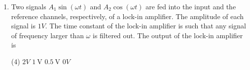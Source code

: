 \begin{enumerate}
\begin{figure}[H]
		\centering
		\texttt{[image: e60]}
	\end{figure}
	The magnitude of the gain at a input signal frequency of $16 \mathrm{kHz}$ is
	{}
	\begin{tasks}(4)
		\task[\textbf{B.}] $0.15$
		\task[\textbf{C.}] $0.3$
		\task[\textbf{D.}] $3.5$
	\end{tasks}
\begin{answer}
	\begin{align*}
	\frac{V_{o}}{V_{i n}}&=-\frac{z_{F}}{z_{i}}=-\frac{R_{F} \| X_{C_{F}}}{R_{i}+X_{C_{i}}}=-\frac{R_{F} \times \frac{1}{J \omega c_{F}} /\left(R_{F}+\frac{1}{J \omega c_{F}}\right)}{\left(R_{i}+\frac{1}{J \omega c_{i}}\right)}\\
	\frac{V_{o}}{V_{i n}}&=\frac{-R_{F} /\left(J \omega c_{F} R_{F}+1\right)}{\left(j \omega c_{i} R_{i}+1\right) / j \omega c_{i}}=\frac{-R_{F}}{\left(j \omega c_{F} R_{F}+1\right)} \times \frac{j \omega c_{i}}{\left(1+j \omega R_{i} c_{i}\right)}\\
	\Rightarrow\left|\frac{V_{o}}{V_{\text {in }}}\right|&=\frac{\omega c_{i} R_{F}}{\sqrt{1+\left(\omega c_{F} R_{F}\right)^{2}} \sqrt{1+\left(\omega R_{i} c_{i}\right)^{2}}}, \omega=2 \pi f
	\intertext{$\Rightarrow\left|\frac{V_{0}}{V_{\text {ln }}}\right|=\frac{\left(2 \pi \times 16 \times 10^{3}\right)\left(10 \times 10^{-9}\right)\left(200 \times 10^{3}\right)}{\sqrt{1+4 \pi^{2}\left(16 \times 10^{3}\right)^{2}\left(200 \times 10^{3}\right)^{2}\left(100 \times 10^{-12}\right)^{2}} \sqrt{1+4 \pi^{2}\left(16 \times 10^{3}\right)^{2}\left(20 \times 10^{3}\right)^{2}\left(10 \times 10^{-9}\right)^{2}}}$}
	\Rightarrow\left|\frac{V_{0}}{V_{\mathrm{ln}}}\right|&=\frac{64 \pi}{2.4 \times 20.12} \approx 4.45
	\end{align*}
	So the correct answer is \textbf{Option (D)}
\end{answer}
	\item Two signals $A_{1} \sin (\omega t)$ and $A_{2} \cos (\omega t)$ are fed into the input and the reference channels, respectively, of a lock-in amplifier. The amplitude of each signal is $1 V$. The time constant of the lock-in amplifier is such that any signal of frequency larger than $\omega$ is filtered out. The output of the lock-in amplifier is
	{}
	\begin{tasks}(4)
		\task[\textbf{A.}]  $2 V$
		\task[\textbf{B.}] $1 \mathrm{~V}$
		\task[\textbf{C.}] $0.5 \mathrm{~V}$
		\task[\textbf{D.}] $0 V$
	\end{tasks}

\end{enumerate}
